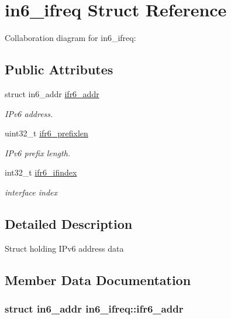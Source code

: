 \hypertarget{structin6__ifreq}{}\section{in6\+\_\+ifreq Struct Reference}
\label{structin6__ifreq}


Collaboration diagram for in6\+\_\+ifreq\+:
\subsection*{Public Attributes}
\begin{DoxyCompactItemize}
\item 
struct in6\+\_\+addr \hyperlink{structin6__ifreq_ac42518a11ef89651f83a1407969fb303}{ifr6\+\_\+addr}
\begin{DoxyCompactList}\small\item\em I\+Pv6 address. \end{DoxyCompactList}\item 
uint32\+\_\+t \hyperlink{structin6__ifreq_aaa90545d34462d8eac46393ea8a5469c}{ifr6\+\_\+prefixlen}
\begin{DoxyCompactList}\small\item\em I\+Pv6 prefix length. \end{DoxyCompactList}\item 
int32\+\_\+t \hyperlink{structin6__ifreq_a9abf044d86eb728f5bb4869d20290a55}{ifr6\+\_\+ifindex}
\begin{DoxyCompactList}\small\item\em interface index \end{DoxyCompactList}\end{DoxyCompactItemize}


\subsection{Detailed Description}
Struct holding I\+Pv6 address data 

\subsection{Member Data Documentation}
\subsubsection[{\texorpdfstring{ifr6\+\_\+addr}{ifr6_addr}}]{\setlength{\rightskip}{0pt plus 5cm}struct in6\+\_\+addr in6\+\_\+ifreq\+::ifr6\+\_\+addr}\hypertarget{structin6__ifreq_ac42518a11ef89651f83a1407969fb303}{}\label{structin6__ifreq_ac42518a11ef89651f83a1407969fb303}


